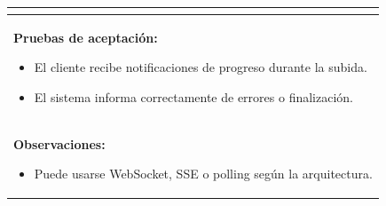\begin{table}[H]
\begin{center}
\begin{tabularx}{\textwidth}{|l|X|l|}
{            } \\
            \hline
            \multicolumn{3}{|p{\textwidth}|}{
                \textbf{Pruebas de aceptación:}
                \begin{itemize}
                    \item El cliente recibe notificaciones de progreso durante la subida.
                    \item El sistema informa correctamente de errores o finalización.
                \end{itemize}
            }\\
            \hline
            \multicolumn{3}{|p{\textwidth}|}{
                \textbf{Observaciones:}
                \begin{itemize}
                    \item Puede usarse WebSocket, SSE o polling según la arquitectura.
                \end{itemize}
            }\\
            \hline
        \end{tabularx}
    \end{center}
\end{table}

